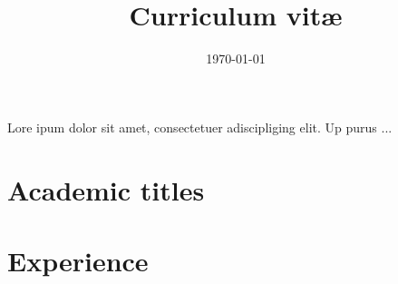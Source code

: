 \documentclass{moderncv}
\title{Curriculum vit\ae}
\date{\today}
\begin{document}
{\fancyfoot[r]{}            %
\setcounter{page}{0}        %
\makelettertitle            %
Lore ipum dolor             %
sit amet, consectetuer 
adiscipliging elit. 
Up purus ... 

\makeletterclosing          %
\newpage 
}%
\maketitle 
\section{Academic titles}
\newpage 
\section{Experience}
\end{document}

